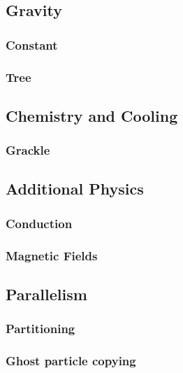 \subsection{Gravity}
\subsubsection{Constant}
\subsubsection{Tree}

\subsection{Chemistry and Cooling}
\subsubsection{Grackle}

\subsection{Additional Physics}
\subsubsection{Conduction}
\subsubsection{Magnetic Fields}

\subsection{Parallelism}
\subsubsection{Partitioning}
\subsubsection{Ghost particle copying}
